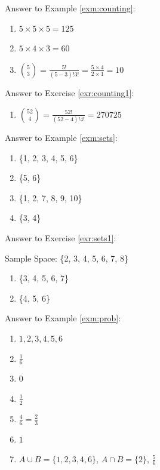 \documentclass[
]{book}
\providecommand{\tightlist}{%
  \setlength{\itemsep}{0pt}\setlength{\parskip}{0pt}}
\theoremstyle{definition}
\theoremstyle{definition}
\theoremstyle{definition}
\theoremstyle{remark}
\begin{document}
Answer to Example \ref{exm:counting}:

\begin{enumerate}
\def\labelenumi{\arabic{enumi}.}
\item
  \(5 \times 5 \times 5 = 125\)
\item
  \(5 \times 4 \times 3 = 60\)
\item
  \(\binom{5}{3} = \frac{5!}{(5-3)!3!} = \frac{5 \times 4}{2 \times 1} = 10\)
\end{enumerate}

Answer to Exercise \ref{exr:counting1}:

\begin{enumerate}
\def\labelenumi{\arabic{enumi}.}
\tightlist
\item
  \(\binom{52}{4} = \frac{52!}{(52-4)!4!} = 270725\)
\end{enumerate}

Answer to Example \ref{exm:sets}:

\begin{enumerate}
\def\labelenumi{\arabic{enumi}.}
\tightlist
\item
  \{1, 2, 3, 4, 5, 6\}
\item
  \{5, 6\}
\item
  \{1, 2, 7, 8, 9, 10\}
\item
  \{3, 4\}
\end{enumerate}

Answer to Exercise \ref{exr:sets1}:

Sample Space: \{2, 3, 4, 5, 6, 7, 8\}

\begin{enumerate}
\def\labelenumi{\arabic{enumi}.}
\tightlist
\item
  \{3, 4, 5, 6, 7\}
\item
  \{4, 5, 6\}
\end{enumerate}

Answer to Example \ref{exm:prob}:

\begin{enumerate}
\def\labelenumi{\arabic{enumi}.}
\item
  \({1, 2, 3, 4, 5, 6}\)
\item
  \(\frac{1}{6}\)
\item
  \(0\)
\item
  \(\frac{1}{2}\)
\item
  \(\frac{4}{6} = \frac{2}{3}\)
\item
  \(1\)
\item
  \(A\cup B=\{1, 2, 3, 4, 6\}\), \(A\cap B=\{2\}\), \(\frac{5}{6}\)
\end{enumerate}
\end{document}
